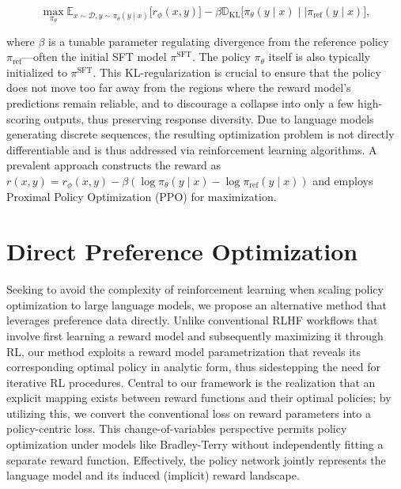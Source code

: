 \begin{equation}\label{eq:RL}
\max_{\pi_{\theta}}  \mathbb{E}_{x\sim \mathcal{D}, y\sim \pi_{\theta}(y \mid x)}\bigl[r_{\phi}(x, y)\bigr] - \beta\mathbb{D}_{\textrm{KL}}\bigl[\pi_{\theta}(y\mid x)\mid \mid \pi_\text{ref}(y\mid x)\bigr],
\end{equation}

where $\beta$ is a tunable parameter regulating divergence from the reference policy $\pi_\text{ref}$—often the initial SFT model $\pi^\text{SFT}$. The policy $\pi_\theta$ itself is also typically initialized to $\pi^\text{SFT}$. This KL-regularization is crucial to ensure that the policy does not move too far away from the regions where the reward model's predictions remain reliable, and to discourage a collapse into only a few high-scoring outputs, thus preserving response diversity. Due to language models generating discrete sequences, the resulting optimization problem is not directly differentiable and is thus addressed via reinforcement learning algorithms. A prevalent approach \citep{ziegler2020finetuning, stiennon2022learning, bai2022training, ouyang2022training} constructs the reward as ${r(x, y) = r_{\phi}(x, y) -\beta (\log \pi_{\theta}(y\mid x) - \log \pi_\text{ref}(y\mid x))}$ and employs Proximal Policy Optimization (PPO) \cite{schulman2017proximal} for maximization.

\section{Direct Preference Optimization}\label{sec:DPO}

Seeking to avoid the complexity of reinforcement learning when scaling policy optimization to large language models, we propose an alternative method that leverages preference data directly. Unlike conventional RLHF workflows that involve first learning a reward model and subsequently maximizing it through RL, our method exploits a reward model parametrization that reveals its corresponding optimal policy in analytic form, thus sidestepping the need for iterative RL procedures. Central to our framework is the realization that an explicit mapping exists between reward functions and their optimal policies; by utilizing this, we convert the conventional loss on reward parameters into a policy-centric loss. This change-of-variables perspective permits policy optimization under models like Bradley-Terry without independently fitting a separate reward function. Effectively, the policy network jointly represents the language model and its induced (implicit) reward landscape.

